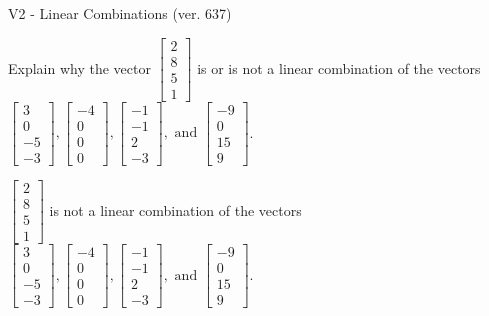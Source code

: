 \begin{exercise}
  \begin{exerciseTitle}V2 - Linear Combinations (ver. 637)\end{exerciseTitle}
  \begin{exerciseStatement}
    Explain why the vector \(\left[\begin{array}{c}
2 \\
8 \\
5 \\
1
\end{array}\right]\)  is or is not a linear 
	combination of the vectors \(\left[\begin{array}{c}
3 \\
0 \\
-5 \\
-3
\end{array}\right] , \left[\begin{array}{c}
-4 \\
0 \\
0 \\
0
\end{array}\right] , \left[\begin{array}{c}
-1 \\
-1 \\
2 \\
-3
\end{array}\right] , \text{ and } \left[\begin{array}{c}
-9 \\
0 \\
15 \\
9
\end{array}\right]\).
	


  \end{exerciseStatement}
  \begin{exerciseAnswer}
   \(\left[\begin{array}{c}
2 \\
8 \\
5 \\
1
\end{array}\right]\) 
  	 is not  
	a linear combination of the vectors \(\left[\begin{array}{c}
3 \\
0 \\
-5 \\
-3
\end{array}\right] , \left[\begin{array}{c}
-4 \\
0 \\
0 \\
0
\end{array}\right] , \left[\begin{array}{c}
-1 \\
-1 \\
2 \\
-3
\end{array}\right] , \text{ and } \left[\begin{array}{c}
-9 \\
0 \\
15 \\
9
\end{array}\right]\).


\end{exerciseAnswer}
\end{exercise}
